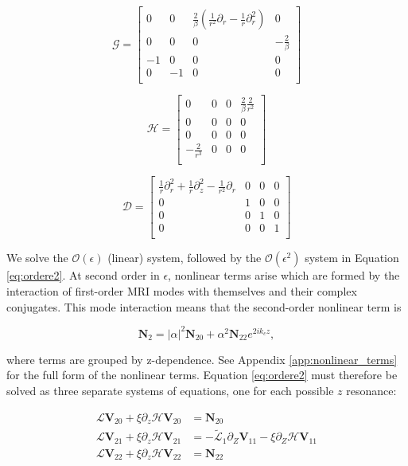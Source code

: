 \documentclass{emulateapj}
\newcommand{\beq}{\begin{equation}}
\newcommand{\eeq}{\end{equation}}
\begin{document}
\beq
\mathcal{G} = \left[\begin{matrix}
0 & 0 & \frac{2}{\beta}(\frac{1}{r^2}\partial_r - \frac{1}{r}\partial_r^2) & 0 \\
0 & 0 & 0 & -\frac{2}{\beta} \\
-1 & 0 & 0 & 0 \\
0 & -1 & 0 & 0 \\
\end{matrix}\right]
\eeq

\beq
\mathcal{H} = \left[\begin{matrix}
0 & 0 & 0 & \frac{2}{\beta} \frac{2}{r^2} \\
0 & 0 & 0 & 0 \\
0 & 0 & 0 & 0 \\
-\frac{2}{r^3} & 0 & 0 & 0 \\
\end{matrix}\right]
\eeq

\beq
\mathcal{D} = \left[\begin{matrix}
\frac{1}{r}\partial_r^2 + \frac{1}{r}\partial_z^2 - \frac{1}{r^2}\partial_r & 0 & 0 & 0 \\
0 & 1 & 0 & 0 \\
0 & 0 & 1 & 0 \\
0 & 0 & 0 & 1 \\
\end{matrix}\right]
\eeq

We solve the $\mathcal{O}(\epsilon)$ (linear) system, followed by the $\mathcal{O}(\epsilon^2)$ system in Equation \ref{eq:ordere2}. At second order in $\epsilon$, nonlinear terms arise which are formed by the interaction of first-order MRI modes with themselves and their complex conjugates. This mode interaction means that the second-order nonlinear term is 

\beq
\mathbf{N}_2 = |\alpha|^2 \mathbf{N}_{20} + \alpha^2 \mathbf{N}_{22} e^{2 i k_c z},
\eeq

where terms are grouped by z-dependence. See Appendix \ref{app:nonlinear_terms} for the full form of the nonlinear terms. Equation \ref{eq:ordere2} must therefore be solved as three separate systems of equations, one for each possible $z$ resonance: 

\begin{align}
\mathcal{L}\mathbf{V}_{20} + \xi \partial_z \mathcal{H} \mathbf{V}_{20} & = \mathbf{N}_{20}\\
\mathcal{L}\mathbf{V}_{21} + \xi \partial_z \mathcal{H} \mathbf{V}_{21} & = - \widetilde{\mathcal{L}}_1 \partial_Z \mathbf{V}_{11} - \xi \partial_Z \mathcal{H} \mathbf{V}_{11} \\
\mathcal{L}\mathbf{V}_{22} + \xi \partial_z \mathcal{H} \mathbf{V}_{22} & = \mathbf{N}_{22}
\end{align}
\end{document}
